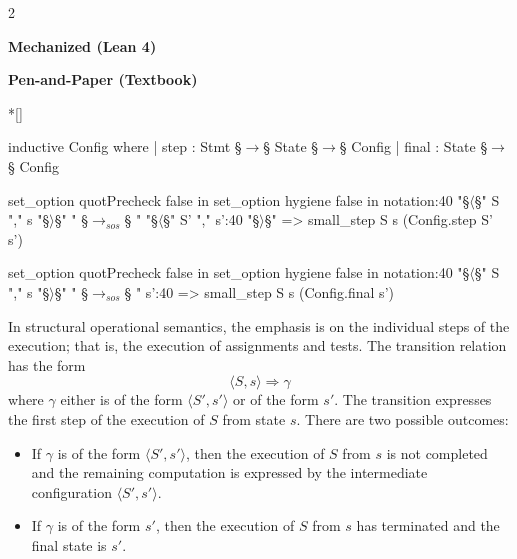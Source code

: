 \vspace{1em}
\begin{paracol}{2}
\begin{leftcolumn}
    \centering \textbf{Mechanized (Lean 4)}
\end{leftcolumn}
\begin{rightcolumn}
    \centering \textbf{Pen-and-Paper (Textbook)} \\\noindent
\end{rightcolumn}

\switchcolumn[1]*[]
\begin{leftcolumn}
    \begin{Lean_Code}
inductive Config where
  | step :
      Stmt  §\(\to\)§ State  §\(\to\)§ Config
  | final :
      State  §\(\to\)§ Config

set_option quotPrecheck
    false in
set_option hygiene false in
notation:40
    "§\color{purple}\(\langle\)§" S "," s "§\color{purple}\(\rangle\)§" " §\color{purple}\(\to_{sos}\)§ "
    "§\color{purple}\(\langle\)§" S' "," s':40 "§\color{purple}\(\rangle\)§" =>
    small_step S s
      (Config.step S' s')

set_option quotPrecheck
    false in
set_option hygiene false in
notation:40
    "§\color{purple}\(\langle\)§" S "," s "§\color{purple}\(\rangle\)§" " §\color{purple}\(\to_{sos}\)§ "
    s':40 =>
    small_step S s
      (Config.final s')
    \end{Lean_Code}
\end{leftcolumn}
\begin{rightcolumn}
In structural operational semantics, the emphasis is on the individual steps of
the execution; that is, the execution of assignments and tests. The transition
relation has the form
\[\langle S , s \rangle \Rightarrow \gamma\]
where \(\gamma\) either is of the form \(\langle S', s' \rangle\) or of the form \(s'\). The transition
expresses the first step of the execution of \(S\) from state \(s\). There are two possible
outcomes:
\begin{itemize}
    \item If \(\gamma\) is of the form \(\langle S', s' \rangle\), then the execution of \(S\) from \(s\) is not completed and
    the remaining computation is expressed by the intermediate configuration
    \(\langle S', s' \rangle\).

    \item If \(\gamma\) is of the form \(s'\), then the execution of \(S\) from \(s\) has terminated and the
    final state is \(s'\).
\end{itemize}
\end{rightcolumn}
\vspace{2em}



\end{paracol}

